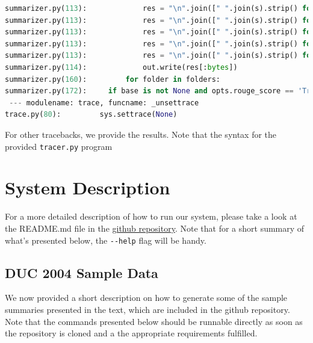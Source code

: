 \documentclass[11pt]{article}
\begin{document}
\begin{lstlisting}[breaklines,language=Python]
summarizer.py(113):             res = "\n".join([" ".join(s).strip() for s in summary])
summarizer.py(113):             res = "\n".join([" ".join(s).strip() for s in summary])
summarizer.py(113):             res = "\n".join([" ".join(s).strip() for s in summary])
summarizer.py(113):             res = "\n".join([" ".join(s).strip() for s in summary])
summarizer.py(113):             res = "\n".join([" ".join(s).strip() for s in summary])
summarizer.py(114):             out.write(res[:bytes])
summarizer.py(160):         for folder in folders:
summarizer.py(172):     if base is not None and opts.rouge_score == 'True':
 --- modulename: trace, funcname: _unsettrace
trace.py(80):         sys.settrace(None)
\end{lstlisting}

For other tracebacks, we provide the results. Note that the syntax for the provided \verb|tracer.py| program

\section{System Description}
For a more detailed description of how to run our system, please take a look at the README.md file in the \href{https://github.com/kandluis/document_summaries}{github repository}. Note that for a short summary of what's presented below, the \verb|--help| flag will be handy.

\subsection{DUC 2004 Sample Data}
\label{subsec:duc_sample_data}
We now provided a short description on how to generate some of the sample summaries presented in the text, which are included in the github repository. Note that the commands presented below should be runnable directly as soon as the repository is cloned and a the appropriate requirements fulfilled.
\end{document}
